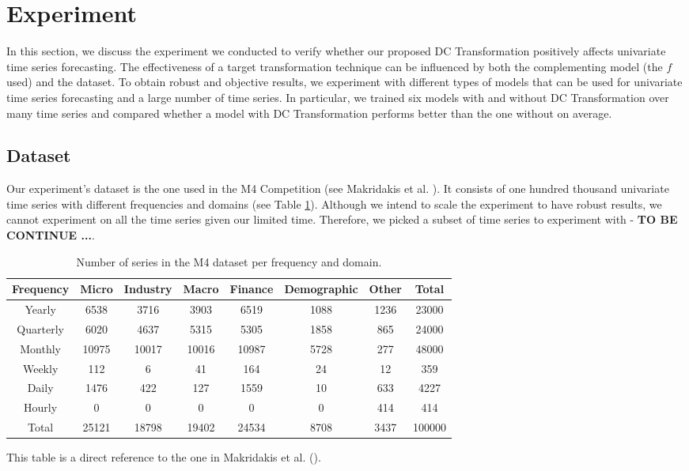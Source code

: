 \section{Experiment}\label{sec: experiment}
In this section, we discuss the experiment we conducted to verify whether our proposed DC Transformation positively affects univariate time series forecasting. The effectiveness of a target transformation technique can be influenced by both the complementing model (the $f$ used) and the dataset. To obtain robust and objective results, we experiment with different types of models that can be used for univariate time series forecasting and a large number of time series. In particular, we trained six models with and without DC Transformation over many time series and compared whether a model with DC Transformation performs better than the one without on average.

\subsection{Dataset}
Our experiment's dataset is the one used in the M4 Competition (see Makridakis et al. \citeyear{MAKRIDAKIS202054}). It consists of one hundred thousand univariate time series with different frequencies and domains (see Table \ref{tbl: m4 dataset}). Although we intend to scale the experiment to have robust results, we cannot experiment on all the time series given our limited time. Therefore, we picked a subset of time series to experiment with - \textbf{TO BE CONTINUE ...}.
\begin{center}
    \begin{table}
        \begin{tabular}{|c || c c c c c || c || c|} 
            \hline
            Frequency & Micro & Industry & Macro & Finance & Demographic & Other & Total \\
            \hline\hline
            Yearly    & 6538 & 3716 & 3903 & 6519 & 1088 & 1236 & 23000 \\
            \hline
            Quarterly & 6020 & 4637 & 5315 & 5305 & 1858 & 865  & 24000 \\
            \hline
            Monthly   &10975 &10017 &10016 &10987 & 5728 & 277  & 48000 \\
            \hline
            Weekly    & 112  & 6    & 41   & 164  & 24   & 12   & 359   \\
            \hline
            Daily     & 1476 & 422  & 127  & 1559 & 10   & 633  & 4227  \\
            \hline
            Hourly    & 0    & 0    & 0    & 0    & 0    & 414  & 414   \\
            \hline\hline
            Total     &25121 &18798 &19402 &24534 & 8708 & 3437 & 100000 \\
            \hline
        \end{tabular}
        \caption{Number of series in the M4 dataset per frequency and domain.}
        {\raggedright This table is a direct reference to the one in Makridakis et al. (\citeyear{MAKRIDAKIS202054}).  \par}
        \label{tbl: m4 dataset}
    \end{table}
\end{center}


